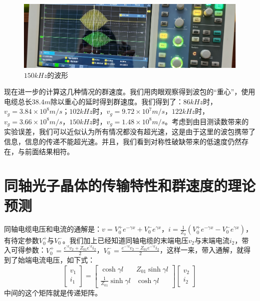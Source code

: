 \documentclass[fleqn,10pt]{SelfArx} %
\begin{document}
\begin{figure}[htbp]
	\centering
	\includegraphics[width=\linewidth]{pic4.jpg}
	\caption{$150kHz$的波形}
	\label{fig:a8}
\end{figure}

现在进一步的计算这几种情况的群速度。我们用肉眼观察得到波包的“重心”，使用电缆总长$38.4m$除以重心的延时得到群速度。我们得到了：$86kHz$时，$v_g=3.84\times10^8m/s$；$102kHz$时，$v_g=9.72\times10^7m/s$，$122kHz$时，$v_g=3.66\times10^8m/s$，$150kHz$时，$v_g=1.48\times10^8m/s$。考虑到由目测读数带来的实验误差，我们可以近似认为所有情况都没有超光速，这是由于这里的波包携带了信息，信息的传递不能超光速。并且，我们看到对称性破缺带来的低速度仍然存在，与前面结果相符。


\section{同轴光子晶体的传输特性和群速度的理论预测}

同轴电缆电压和电流的通解是：$v=V_0^+e^{-\gamma x}+V_0^-e^{\gamma x}$，$i=\frac{1}{Z_0}(V_0^+e^{-\gamma x}-V_0^-e^{\gamma x})$，有待定参数$V_0^+$与$V_0^-$。我们加上已经知道同轴电缆的末端电压$v_2$与末端电流$i_2$，带入可得参数：$V_0^+=\frac{e^{\gamma l}v_2+Z_{01}e^{\gamma l}i_2}{2}$，$V_0^-=\frac{e^{-\gamma l}v_2-Z_{01}e^{-\gamma l}i_2}{2}$，这样一来，带入通解，就得到了始端电流电压，如下式：
\begin{equation*}
	\begin{bmatrix}
		v_1 \\
		i_1
	\end{bmatrix}=
	\begin{bmatrix}
		\cosh{\gamma l} & Z_{01}\sinh{\gamma l} \\
		\frac{1}{Z_{01}}\sinh{\gamma l} & \cosh{\gamma l}
	\end{bmatrix}
	\begin{bmatrix}
		v_2 \\
		i_2
	\end{bmatrix}
\end{equation*}
中间的这个矩阵就是传递矩阵。
\end{document}
